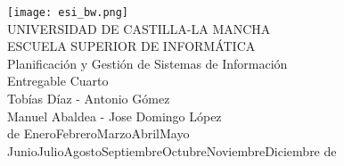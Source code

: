 
%
%

\thispagestyle{empty}
\begin{center}
  \texttt{[image: esi\_bw.png]} \\
  \vspace{14mm}
  {\Huge UNIVERSIDAD DE CASTILLA-LA MANCHA} \\
  \bigskip
  {\LARGE ESCUELA SUPERIOR DE INFORMÁTICA} \\
  \vspace{14mm}
  {\LARGE Planificación y Gestión de Sistemas de Información} \\
  \bigskip
  {\LARGE Entregable Cuarto} \\
  \vspace{18mm}
  {\large Tobías Díaz - Antonio Gómez} \\
  {\large Manuel Abaldea - Jose Domingo López} \\
  \vspace{6mm}
  {\large \the\day{} de \ifcase\month\or Enero\or Febrero\or Marzo\or Abril\or Mayo\or%
    Junio\or Julio\or Agosto\or Septiembre\or Octubre\or Noviembre\or Diciembre\fi{} de \the\year}
\end{center}

\newpage
